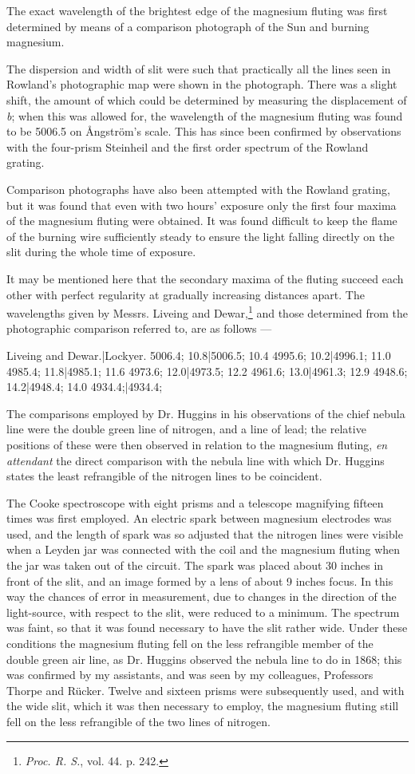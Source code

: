 \documentclass[a4paper, 12pt, oneside, polutonikogreek, english]{article}
\begin{document}
The exact wavelength of the brightest edge of the magnesium fluting was first determined by means of a comparison photograph of the Sun and burning magnesium.

The dispersion and width of slit were such that practically all the lines seen in Rowland's photographic map were shown in the photograph. There was a slight shift, the amount of which could be determined by measuring the displacement of \emph{b}; when this was allowed for, the wavelength of the magnesium fluting was found to be 5006.5 on Ångström's scale. This has since been confirmed by observations with the four-prism Steinheil and the first order spectrum of the Rowland grating.

Comparison photographs have also been attempted with the Rowland grating, but it was found that even with two hours' exposure only the first four maxima of the magnesium fluting were obtained. It was found difficult to keep the flame of the burning wire sufficiently steady to ensure the light falling directly on the slit during the whole time of exposure.

It may be mentioned here that the secondary maxima of the fluting succeed each other with perfect regularity at gradually increasing distances apart. The wavelengths given by Messrs. Liveing and Dewar,\footnote{\emph{Proc. R. S.}, vol. 44. p. 242.} and those determined from the photographic comparison referred to, are as follows ---

Liveing and Dewar.|Lockyer. 
5006.4; 10.8|5006.5; 10.4 
4995.6; 10.2|4996.1; 11.0 
4985.4; 11.8|4985.1; 11.6 
4973.6; 12.0|4973.5; 12.2 
4961.6; 13.0|4961.3; 12.9 
4948.6; 14.2|4948.4; 14.0 
4934.4;|4934.4;

The comparisons employed by Dr. Huggins in his observations of the chief nebula line were the double green line of nitrogen, and a line of lead; the relative positions of these were then observed in relation to the magnesium fluting, \emph{en attendant} the direct comparison with the nebula line with which Dr. Huggins states the least refrangible of the nitrogen lines to be coincident.

The Cooke spectroscope with eight prisms and a telescope magnifying fifteen times was first employed. An electric spark between magnesium electrodes was used, and the length of spark was so adjusted that the nitrogen lines were visible when a Leyden jar was connected with the coil and the magnesium fluting when the jar was taken out of the circuit. The spark was placed about 30 inches in front of the slit, and an image formed by a lens of about 9 inches focus. In this way the chances of error in measurement, due to changes in the direction of the light-source, with respect to the slit, were reduced to a minimum. The spectrum was faint, so that it was found necessary to have the slit rather wide. Under these conditions the magnesium fluting fell on the less refrangible member of the double green air line, as Dr. Huggins observed the nebula line to do in 1868; this was confirmed by my assistants, and was seen by my colleagues, Professors Thorpe and Rücker. Twelve and sixteen prisms were subsequently used, and with the wide slit, which it was then necessary to employ, the magnesium fluting still fell on the less refrangible of the two lines of nitrogen.
\end{document}
